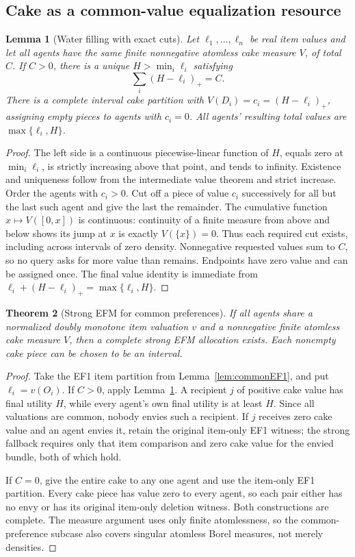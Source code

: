 \documentclass[11pt,a4paper]{article}
\newtheorem{theorem}{Theorem}[section]
\newtheorem{lemma}[theorem]{Lemma}
\theoremstyle{remark}\newtheorem{remark}[theorem]{Remark}
\begin{document}
\subsection{Cake as a common-value equalization resource}
\begin{lemma}[Water filling with exact cuts]\label{lem:water}
Let $\ell_1,\ldots,\ell_n$ be real item values and let all agents have the same finite nonnegative atomless cake measure $V$, of total $C$. If $C>0$, there is a unique $H>\min_i\ell_i$ satisfying
\[
\sum_i(H-\ell_i)_+=C.
\]
There is a complete interval cake partition with $V(D_i)=c_i=(H-\ell_i)_+$, assigning empty pieces to agents with $c_i=0$. All agents' resulting total values are $\max\{\ell_i,H\}$.
\end{lemma}
\begin{proof}
The left side is a continuous piecewise-linear function of $H$, equals zero at $\min_i\ell_i$, is strictly increasing above that point, and tends to infinity. Existence and uniqueness follow from the intermediate value theorem and strict increase. Order the agents with $c_i>0$. Cut off a piece of value $c_i$ successively for all but the last such agent and give the last the remainder. The cumulative function $x\mapsto V([0,x])$ is continuous: continuity of a finite measure from above and below shows its jump at $x$ is exactly $V(\{x\})=0$. Thus each required cut exists, including across intervals of zero density. Nonnegative requested values sum to $C$, so no query asks for more value than remains. Endpoints have zero value and can be assigned once. The final value identity is immediate from $\ell_i+(H-\ell_i)_+=\max\{\ell_i,H\}$.
\end{proof}

\begin{theorem}[Strong EFM for common preferences]\label{thm:commonEFM}
If all agents share a normalized doubly monotone item valuation $v$ and a nonnegative finite atomless cake measure $V$, then a complete strong EFM allocation exists. Each nonempty cake piece can be chosen to be an interval.
\end{theorem}
\begin{proof}
Take the EF1 item partition from Lemma~\ref{lem:commonEF1}, and put $\ell_i=v(O_i)$. If $C>0$, apply Lemma~\ref{lem:water}. A recipient $j$ of positive cake value has final utility $H$, while every agent's own final utility is at least $H$. Since all valuations are common, nobody envies such a recipient. If $j$ receives zero cake value and an agent envies it, retain the original item-only EF1 witness; the strong fallback requires only that item comparison and zero cake value for the envied bundle, both of which hold.

If $C=0$, give the entire cake to any one agent and use the item-only EF1 partition. Every cake piece has value zero to every agent, so each pair either has no envy or has its original item-only deletion witness. Both constructions are complete. The measure argument uses only finite atomlessness, so the common-preference subcase also covers singular atomless Borel measures, not merely densities.
\end{proof}
\end{document}

